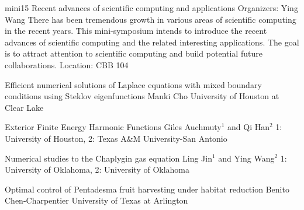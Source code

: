 \mini
{mini15}
{Recent advances of scientific computing and applications}
{Organizers: Ying Wang}
{There has been tremendous growth in various areas of scientific computing in the recent years. This mini-symposium intends to introduce the recent advances of scientific computing and the related interesting applications. The goal is to attract attention to scientific computing and build potential future collaborations.}
{Location: CBB 104}

\begin{talks}
\item\talk
{Efficient numerical solutions of Laplace equations with mixed boundary conditions using Steklov eigenfunctions }
{Manki Cho}
{University of Houston at Clear Lake}
\item\talk
{Exterior Finite Energy Harmonic Functions}
{Giles Auchmuty$^{1}$  and Qi Han$^{2}$}
{1: University of Houston, 2: Texas A\&M University-San Antonio}
\item\talk
{Numerical studies to the Chaplygin gas equation}
{Ling Jin$^{1}$ and Ying Wang$^{2}$}
{1: University of Oklahoma, 2: University of Oklahoma}
\item\talk
{Optimal control of Pentadesma fruit harvesting under habitat reduction}
{Benito Chen-Charpentier}
{University of Texas at Arlington}
\end{talks}
\room
